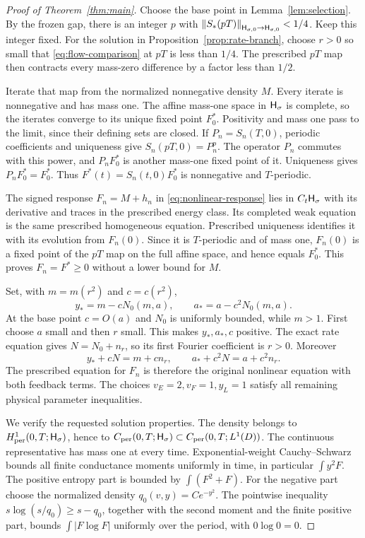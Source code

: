 \begin{proof}[Proof of Theorem~\ref{thm:main}]
Choose the base point in Lemma~\ref{lem:selection}. By the frozen gap,
there is an integer $p$ with
$\left\|S_*(pT)\right\|_{\mathsf H_{\sigma,0}\to\mathsf H_{\sigma,0}}<1/4$.
Keep this integer fixed. For the solution in
Proposition~\ref{prop:rate-branch}, choose $r>0$ so small that
\eqref{eq:flow-comparison} at $pT$ is less than $1/4$.
The prescribed $pT$ map then contracts every mass-zero difference
by a factor less than $1/2$.

Iterate that map from the normalized nonnegative density $M$.
Every iterate is nonnegative and has mass one. The affine
mass-one space in $\mathsf H_\sigma$ is complete, so the iterates
converge to its unique fixed point $F_0^*$. Positivity and mass
one pass to the limit, since their defining sets are closed.
If $P_n=S_n(T,0)$, periodic coefficients and uniqueness give
$S_n(pT,0)=P_n^p$. The operator $P_n$ commutes with this power,
and $P_nF_0^*$ is another mass-one fixed point of it.
Uniqueness gives $P_nF_0^*=F_0^*$.
Thus $F^*(t)=S_n(t,0)F_0^*$ is nonnegative and $T$-periodic.

The signed response $F_n=M+h_n$ in \eqref{eq:nonlinear-response}
lies in $C_t\mathsf H_\sigma$ with its derivative and traces in the
prescribed energy class. Its completed weak equation is the
same prescribed homogeneous equation. Prescribed uniqueness
identifies it with its evolution from $F_n(0)$. Since it is
$T$-periodic and of mass one, $F_n(0)$ is a fixed point of the
$pT$ map on the full affine space, and hence equals $F_0^*$.
This proves $F_n=F^*\ge0$ without a lower bound for $M$.

Set, with $m=m(r^2)$ and $c=c(r^2)$,
\begin{equation}\label{eq:physical-reconstruction}
 y_*=m-cN_0(m,a),\qquad a_*=a-c^2N_0(m,a).
\end{equation}
At the base point $c=O(a)$ and $N_0$ is uniformly bounded, while
$m>1$. First choose $a$ small and then $r$ small. This makes
$y_*,a_*,c$ positive. The exact rate equation gives
$N=N_0+n_r$, so its first Fourier coefficient is $r>0$.
Moreover
\[
 y_*+cN=m+cn_r,\qquad a_*+c^2N=a+c^2n_r .
\]
The prescribed equation for $F_n$ is therefore the original
nonlinear equation with both feedback terms. The choices
$v_E=2,v_F=1,y_L=1$ satisfy all remaining physical parameter
inequalities.

We verify the requested solution properties. The density belongs
to $H^1_{\mathrm{per}}(0,T;\mathsf H_\sigma)$, hence to
$C_{\mathrm{per}}(0,T;\mathsf H_\sigma)\subset C_{\mathrm{per}}(0,T;L^1(D))$.
The continuous representative has mass one at every time.
Exponential-weight Cauchy--Schwarz bounds all finite conductance
moments uniformly in time, in particular $\int y^2F$.
The positive entropy part is bounded by $\int(F^2+F)$.
For the negative part choose the normalized density
$q_0(v,y)=C e^{-y^2}$. The pointwise inequality
$s\log(s/q_0)\ge s-q_0$, together with the second moment and the
finite positive part, bounds $\int|F\log F|$ uniformly over
the period, with $0\log0=0$.


\end{proof}
